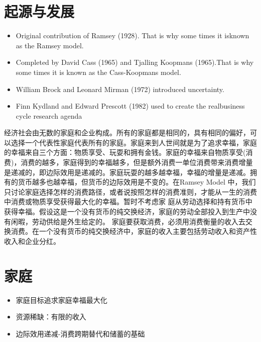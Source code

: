 \section{起源与发展}

\begin{itemize}
\item Original contribution of Ramsey (1928). That is why some times it isknown as the Ramsey model.
\item Completed by David Cass (1965) and Tjalling Koopmans (1965).That is why some times it is known as the Cass-Koopmans model.
\item William Brock and Leonard Mirman (1972) introduced uncertainty.
\item Finn Kydland and Edward Prescott (1982) used to create the realbusiness cycle research agenda
\end{itemize}

经济社会由无数的家庭和企业构成。所有的家庭都是相同的，具有相同的偏好，可以选择一个代表性家庭代表所有的家庭。家庭来到人世间就是为了追求幸福，家庭的幸福来自三个方面：物质享受、玩耍和拥有金钱。家庭的幸福来自物质享受(消费)，消费的越多，家庭得到的幸福越多，但是额外消费一单位消费带来消费增量是递减的，即边际效用是递减的。家庭玩耍的越多越幸福，幸福的增量是递减。拥有的货币越多也越幸福，但货币的边际效用是不变的。在Ramsey Model 中，我们只讨论家庭选择怎样的消费路径，或者说按照怎样的消费准则，才能从一生的消费中消费或物质享受获得最大化的幸福。暂时不考虑家
庭从劳动选择和持有货币中获得幸福。假设这是一个没有货币的纯交换经济，家庭的劳动全部投入到生产中没有闲暇，劳动供给是外生给定的。
家庭要获取消费，必须用消费衡量的收入去交换消费。在一个没有货币的纯交换经济中，家庭的收入主要包括劳动收入和资产性收入和企业分红。 

\section{家庭}
   
\begin{itemize}
	\item 家庭目标追求家庭幸福最大化
	\item 资源稀缺：有限的收入
	\item 边际效用递减-消费跨期替代和储蓄的基础
\end{itemize}

